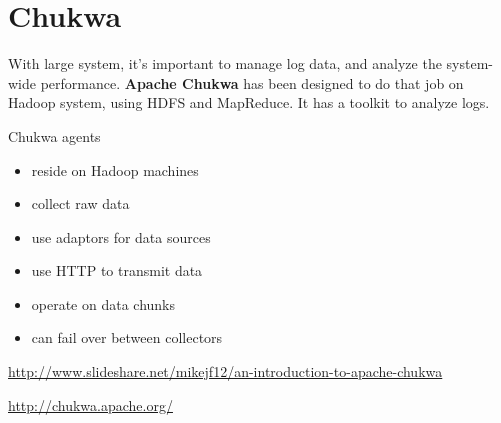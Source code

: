 \chapter{Chukwa}
\label{chap:Chukwa}

With large system, it's important to manage log data, and analyze the
system-wide performance. {\bf Apache Chukwa} has been designed to do that job on
Hadoop system, using HDFS and MapReduce. It has a toolkit to analyze logs.

Chukwa agents
\begin{itemize}
  \item reside on Hadoop machines
  \item collect raw data
  \item use adaptors for data sources
  \item use HTTP to transmit data
  \item operate on data chunks
  \item can fail over between collectors
\end{itemize}
\url{http://www.slideshare.net/mikejf12/an-introduction-to-apache-chukwa}

\url{http://chukwa.apache.org/}